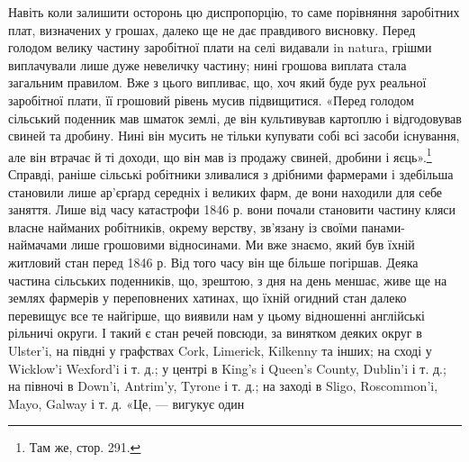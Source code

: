 Навіть коли залишити осторонь цю диспропорцію, то саме
порівняння заробітних плат, визначених у грошах, далеко ще
не дає правдивого висновку. Перед голодом велику частину заробітної
плати на селі видавали in natura, грішми виплачували
лише дуже невеличку частину; нині грошова виплата стала загальним
правилом. Вже з цього випливає, що, хоч який буде
рух реальної заробітної плати, її грошовий рівень мусив підвищитися.
«Перед голодом сільський поденник мав шматок
землі, де він культивував картоплю і відгодовував свиней та
дробину. Нині він мусить не тільки купувати собі всі засоби
існування, але він втрачає й ті доходи, що він мав із продажу
свиней, дробини і яєць».\footnote{
Там же, стор. 291.
} Справді, раніше сільські робітники
зливалися з дрібними фармерами і здебільша становили
лише ар’єрґард середніх і великих фарм, де вони находили для
себе заняття. Лише від часу катастрофи 1846 р. вони почали становити
частину кляси власне найманих робітників, окрему верству,
зв’язану із своїми панами-наймачами лише грошовими відносинами.
Ми вже знаємо, який був їхній житловий стан перед 1846 р.
Від того часу він ще більше погіршав. Деяка частина сільських
поденників, що, зрештою, з дня на день меншає, живе ще на
землях фармерів у переповнених хатинах, що їхній огидний стан
далеко перевищує все те найгірше, що виявили нам у цьому відношенні
англійські рільничі округи. І такий є стан речей повсюди,
за винятком деяких округ в Ulster’i, на півдні у графствах
Cork, Limerick, Kilkenny та інших; на сході у Wicklow’i
Wexford’i і т. д.; у центрі в King’s і Queen’s County, Dublin’i
і т. д.; на півночі в Down’i, Antrim’y, Tyrone і т. д.; на заході
в Sligo, Roscommon’i, Mayo, Galway і т. д. «Це, — вигукує один
\parbreak{}  %
